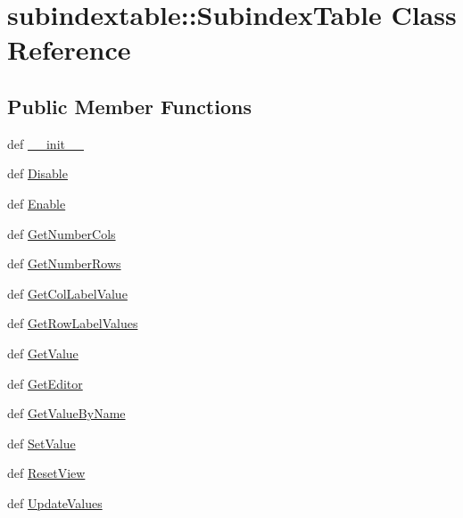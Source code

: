 \hypertarget{classsubindextable_1_1SubindexTable}{
\section{subindextable::Subindex\-Table Class Reference}
\label{classsubindextable_1_1SubindexTable}
}
\subsection*{Public Member Functions}
\begin{CompactItemize}
\item 
def \hyperlink{classsubindextable_1_1SubindexTable_217d723449d9ae8d755dd7ff0c20bc4d}{\_\-\_\-init\_\-\_\-}
\item 
def \hyperlink{classsubindextable_1_1SubindexTable_40407a8d399c7fd09fafa1984f05cfce}{Disable}
\item 
def \hyperlink{classsubindextable_1_1SubindexTable_f9d1c56f6df9baf4e4c6bf80d00fad8c}{Enable}
\item 
def \hyperlink{classsubindextable_1_1SubindexTable_a227b7f00b023072f3b346466a266513}{Get\-Number\-Cols}
\item 
def \hyperlink{classsubindextable_1_1SubindexTable_e4df8be09ce11ef31c05482c9e04b236}{Get\-Number\-Rows}
\item 
def \hyperlink{classsubindextable_1_1SubindexTable_473cb5b7e6e7a31f8668256c1d42eb58}{Get\-Col\-Label\-Value}
\item 
def \hyperlink{classsubindextable_1_1SubindexTable_d37d12554092ade50c2ae8b5395b8bb9}{Get\-Row\-Label\-Values}
\item 
def \hyperlink{classsubindextable_1_1SubindexTable_c365af6b3cd244b836e3f22fb839a93b}{Get\-Value}
\item 
def \hyperlink{classsubindextable_1_1SubindexTable_2e40735bad19bfc79a68770f23d1cce5}{Get\-Editor}
\item 
def \hyperlink{classsubindextable_1_1SubindexTable_65a8c6f7466204e224a289af19248fda}{Get\-Value\-By\-Name}
\item 
def \hyperlink{classsubindextable_1_1SubindexTable_65aeea9932fde2c83878d00f4b78e275}{Set\-Value}
\item 
def \hyperlink{classsubindextable_1_1SubindexTable_56aaa52f5cbbfd3bf243433b798b10c8}{Reset\-View}
\item 
def \hyperlink{classsubindextable_1_1SubindexTable_882d75c01e68c5464cacd8f0b161ecac}{Update\-Values}
\item 

\end{CompactItemize}
